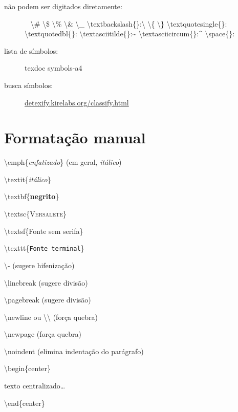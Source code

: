 \documentclass[11pt,twoside,english,brazilian]{article}
\begin{document}
\begin{multicols}{3}
\begin{description}
  \item[não podem ser digitados diretamente:]~\vspace{5pt}\newline
    \textbackslash\#
    \quad\textbackslash\$
    \quad\textbackslash\%
    \quad\textbackslash\&
    \quad\textbackslash\_
    \quad\textbackslash{}textbackslash\{\}:\enspace\textbackslash
    \vspace{3pt}\newline
    \textbackslash\{
    \quad\textbackslash\}
    \quad\textbackslash{}textquotesingle\{\}:\enspace\textquotesingle
    \quad\textbackslash{}textquotedbl\{\}:\enspace\textquotedbl
    \vspace{3pt}\newline
    \textbackslash{}textasciitilde\{\}:\enspace\textasciitilde
    \quad\textbackslash{}textasciicircum\{\}:\enspace\textasciicircum
    \quad\raisebox{-.1\baselineskip}{\`\space}%
        \hspace{.12em}\textbackslash{}space\{\}:
        \enspace\raisebox{-.1\baselineskip}{\`\space}
\end{description}


\vspace{\baselineskip}


\begin{description}
  \item[lista de símbolos:] \textsf{texdoc symbols-a4}
  \item[busca símbolos:] \url{detexify.kirelabs.org/classify.html}
\end{description}

\section*{Formatação manual}

\textbackslash{}emph\{\emph{enfatizado}\} (em geral, \textit{itálico})

\textbackslash{}textit\{\textit{itálico}\}

\textbackslash{}textbf\{\textbf{negrito}\}

\textbackslash{}textsc\{\textsc{Versalete}\}

\textbackslash{}textsf\{\textsf{Fonte sem serifa}\}

\textbackslash{}texttt\{\texttt{Fonte terminal}\}

\textbackslash{}- (sugere hifenização)

\textbackslash{}linebreak (sugere divisão)

\textbackslash{}pagebreak (sugere divisão)

\textbackslash{}newline ou \textbackslash\textbackslash{} (força quebra)

\textbackslash{}newpage (força quebra)

\textbackslash{}noindent (elimina indentação do parágrafo)

\textbackslash{}begin\{center\}

\quad texto centralizado\dots

\textbackslash{}end\{center\}

\end{multicols}

\printbibliography[
  title=\refname\label{bibliografia}, %
]
\end{document}
